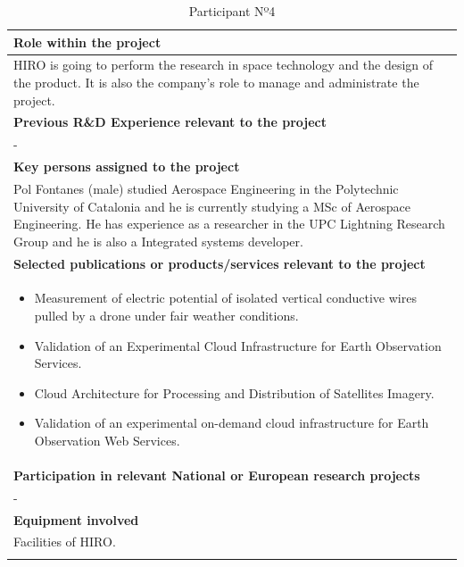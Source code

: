 \begin{longtable}[H]{|p{0.7cm}|p{4cm}|p{7cm}|p{1.3cm}|}
	\multicolumn{4}{|p{13cm}|}{\textbf{Role within the project}}   \\ \hline
	
	\multicolumn{4}{|p{14.5cm}|}{HIRO is going to perform the research in space technology and the design of the product. It is also the company's role to manage and administrate the project.}  \\ \hline
	
	\multicolumn{4}{|p{13cm}|}{\textbf{Previous R\&D Experience relevant to the project}}  \\ \hline
	
	\multicolumn{4}{|p{14.5cm}|}{-}  \\ \hline
	
	\multicolumn{4}{|p{13cm}|}{\textbf{Key persons assigned to the project}}   \\ \hline
	
	\multicolumn{4}{|p{14.5cm}|}{Pol Fontanes (male) studied Aerospace Engineering in the Polytechnic University of Catalonia and he is currently studying a MSc of Aerospace Engineering. He has experience as a researcher in the UPC Lightning Research Group and he is also a Integrated systems developer.} \\ \hline
	
	\multicolumn{4}{|p{13cm}|}{\textbf{Selected publications or products/services relevant to the project}}  \\ \hline
	
	\multicolumn{4}{|p{14.5cm}|}{
		\begin{itemize}
			\item \vspace{-0.5cm}Measurement of electric potential of isolated vertical conductive wires pulled by a drone under fair weather conditions.
			\item Validation of an Experimental Cloud Infrastructure for Earth Observation Services.
			\item Cloud Architecture for Processing and Distribution of Satellites Imagery.
			\item Validation of an experimental on-demand cloud infrastructure for Earth Observation Web Services.\vspace{-0.3cm}
		\end{itemize}}  \\ \hline
	
	\multicolumn{4}{|p{13cm}|}{\textbf{Participation in relevant National or European research projects}}  \\ \hline
	
	\multicolumn{4}{|p{14.5cm}|}{-}  \\ \hline
	
	\multicolumn{4}{|p{13cm}|}{\textbf{Equipment involved}}  \\ \hline
	
	\multicolumn{4}{|p{14.5cm}|}{Facilities of HIRO.}  \\ \hline
	\caption{Participant Nº4}
\end{longtable}



